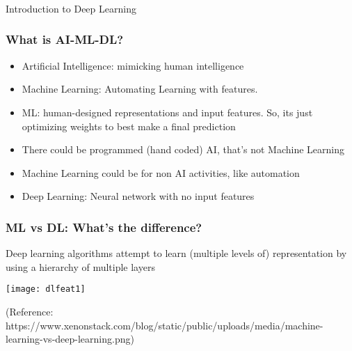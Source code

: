 \begin{frame}[fragile]\frametitle{}
\begin{center}
{\Large Introduction to Deep Learning}
\end{center}
\end{frame}


\begin{frame}[fragile] \frametitle{What is AI-ML-DL?}

\begin{itemize}
\item Artificial Intelligence: mimicking human intelligence
\item Machine Learning: Automating Learning with features. 
\item ML: human-designed representations and input features.  So, its just optimizing weights to best make a final prediction
\item There could be programmed (hand coded) AI, that's not Machine Learning
\item Machine Learning could be for non AI activities, like automation
\item Deep Learning: Neural network with no input features
\end{itemize}
\end{frame}





\begin{frame}[fragile] \frametitle{ML vs DL: What's the difference?}
Deep learning algorithms attempt to learn (multiple levels of) representation by using a hierarchy of multiple layers
\begin{center}
\texttt{[image: dlfeat1]}
\end{center}
\tiny{(Reference: https://www.xenonstack.com/blog/static/public/uploads/media/machine-learning-vs-deep-learning.png)}

\end{frame}

